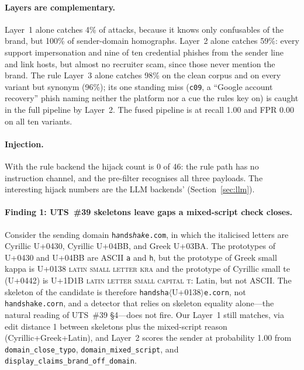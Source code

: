 \documentclass[10pt,twocolumn]{article}
\newcommand{\code}[1]{\texttt{#1}}
\newcommand{\cp}[1]{\mbox{U+#1}}
\begin{document}
\paragraph{Layers are complementary.} Layer~1 alone catches 4\% of attacks, because it knows only confusables of the brand, but 100\% of sender-domain homographs. Layer~2 alone catches 59\%: every support impersonation and nine of ten credential phishes from the sender line and link hosts, but almost no recruiter scam, since those never mention the brand. The rule Layer~3 alone catches 98\% on the clean corpus and on every variant but synonym (96\%); its one standing miss (\code{c09}, a ``Google account recovery'' phish naming neither the platform nor a cue the rules key on) is caught in the full pipeline by Layer~2. The fused pipeline is at recall 1.00 and FPR 0.00 on all ten variants.

\paragraph{Injection.} With the rule backend the hijack count is 0 of 46: the rule path has no instruction channel, and the pre-filter recognises all three payloads. The interesting hijack numbers are the LLM backends' (Section~\ref{sec:llm}).

\paragraph{Finding 1: UTS~\#39 skeletons leave gaps a mixed-script check closes.}
Consider the sending domain \code{h\textit{a}nds\textit{h}a\textit{k}e.com}, in which the italicised letters are Cyrillic \cp{0430}, Cyrillic \cp{04BB}, and Greek \cp{03BA}. The prototypes of \cp{0430} and \cp{04BB} are ASCII \code{a} and \code{h}, but the prototype of Greek small kappa is \cp{0138} \textsc{latin small letter kra} and the prototype of Cyrillic small te (\cp{0442}) is \cp{1D1B} \textsc{latin letter small capital t}: Latin, but not ASCII. The skeleton of the candidate is therefore \code{handsha}$\langle$\cp{0138}$\rangle$\code{e.corn}, not \code{handshake.corn}, and a detector that relies on skeleton equality alone---the natural reading of UTS~\#39 \S4---does not fire. Our Layer~1 still matches, via edit distance 1 between skeletons plus the mixed-script reason (Cyrillic+Greek+Latin), and Layer~2 scores the sender at probability 1.00 from \code{domain\_close\_typo}, \code{domain\_mixed\_script}, and \code{display\_claims\_brand\_off\_domain}.
\end{document}
